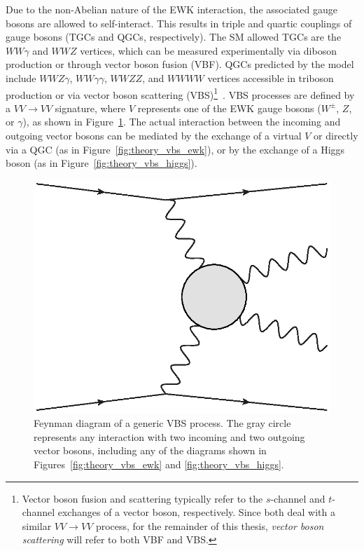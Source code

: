 Due to the non-Abelian nature of the EWK interaction, the associated gauge bosons are allowed to self-interact.
This results in triple and quartic couplings of gauge bosons (TGCs and QGCs, respectively).
The SM allowed TGCs are the $WW\gamma$ and $WWZ$ vertices, which can be measured experimentally via diboson production or through vector boson fusion (VBF).
QGCs predicted by the model include $WWZ\gamma$, $WW\gamma\gamma$, $WWZZ$, and $WWWW$ vertices accessible in triboson production or via vector boson scattering (VBS)\footnote{Vector boson fusion and scattering typically refer to the $s$-channel and $t$-channel exchanges of a vector boson, respectively.  Since both deal with a similar $VV\rightarrow VV$ process, for the remainder of this thesis, \emph{vector boson scattering} will refer to both VBF and VBS.}~\cite{2017.multiboson-at-lhc}.
VBS processes are defined by a $VV\rightarrow VV$ signature, where $V$ represents one of the EWK gauge bosons ($W^{\pm}$, $Z$, or $\gamma$), as shown in Figure~\ref{fig:theory_generic_vbs}.
The actual interaction between the incoming and outgoing vector bosons can be mediated by the exchange of a virtual $V$ or directly via a QGC (as in Figure~\ref{fig:theory_vbs_ewk}), or by the exchange of a Higgs boson (as in Figure~\ref{fig:theory_vbs_higgs}).

\begin{figure}[htbp]
  \centering
  \includegraphics[width=.4\textwidth]{figs/theory/generic_vbs}
  \caption{Feynman diagram of a generic VBS process.  The gray circle represents any interaction with two incoming and two outgoing vector bosons, including any of the diagrams shown in Figures~\ref{fig:theory_vbs_ewk} and \ref{fig:theory_vbs_higgs}.}
  \label{fig:theory_generic_vbs}
\end{figure}


